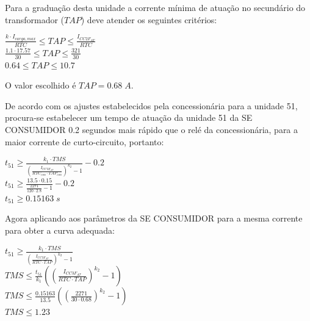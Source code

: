 Para a graduação desta unidade a corrente mínima de atuação no secundário do transformador ($TAP$) deve atender os seguintes critérios:

\begin{center}
$\frac{k \cdot I_{carga,max}}{RTC} \leq TAP \leq \frac{I_{CC2F_{AT}} }{RTC}$ \\ \vspace{5pt}
$\frac{1.1 \cdot 17.57}{30} \leq TAP \leq \frac{321}{30}$ \\ \vspace{5pt}
$0.64 \leq TAP \leq 10.7$ \\ 
\end{center}

O valor escolhido é $TAP = 0.68 \; A$. 

De acordo com os ajustes estabelecidos pela concessionária para a unidade 51, procura-se estabelecer um tempo de atuação da unidade 51 da SE CONSUMIDOR 0.2 segundos mais rápido que o relé da concessionária, para a maior corrente de curto-circuito, portanto:

\begin{center}
$t_{51} \geq \frac{k_1 \cdot TMS}{\left(\frac{I_{CC3F_{AT}}}{RTC_{con} \cdot TAP_{con}}\right)^{k_2}-1} - 0.2$ \\ \vspace{5pt}
$t_{51} \geq \frac{13.5 \cdot 0.15}{\frac{2271}{120 \cdot 2.8}-1} - 0.2$ \\ \vspace{5pt}
$t_{51} \geq 0.15163 \; s$ \\ \vspace{5pt}
\end{center}

Agora aplicando aos parâmetros da SE CONSUMIDOR para a mesma corrente para obter a curva adequada:

\begin{center}
$t_{51} \geq \frac{k_1 \cdot TMS}{\left(\frac{I_{CC3F_{AT}}}{RTC \cdot TAP}\right)^{k_2}-1}$ \\ \vspace{5pt}
$TMS \leq \frac{t_{51}}{k_1} \left(\left(\frac{I_{CC3F_{AT}}}{RTC \cdot TAP}\right)^{k_2}-1\right)$ \\ \vspace{5pt}
$TMS \leq \frac{0.15163}{13.5} \left(\left(\frac{2271}{30 \cdot 0.68}\right)^{k_2}-1\right)$ \\ \vspace{5pt}
$TMS \leq 1.23$ \\ \vspace{5pt}
\end{center}

